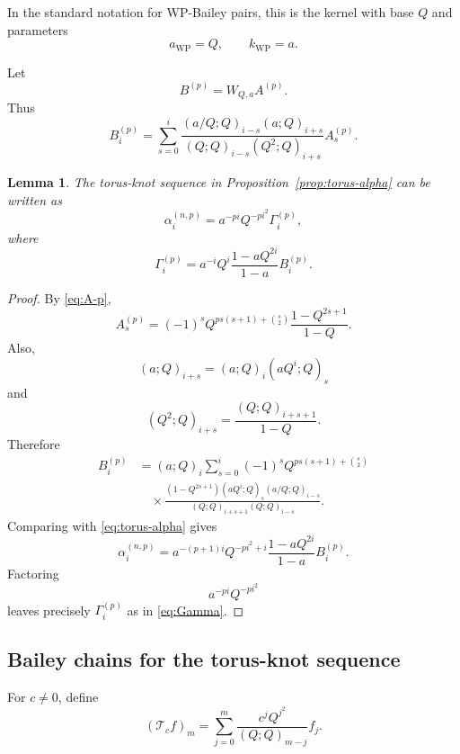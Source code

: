 \documentclass[11pt]{amsart}
\newtheorem{lemma}[theorem]{Lemma}
\begin{document}
In the standard notation for WP-Bailey pairs, this is the kernel with
base \(Q\) and parameters
\[
a_{\mathrm{WP}}=Q,
\qquad
k_{\mathrm{WP}}=a.
\]

Let
\begin{equation}\label{eq:B-def}
B^{(p)}
=
W_{Q,a}A^{(p)}.
\end{equation}
Thus
\begin{equation}\label{eq:B-expanded}
B_i^{(p)}
=
\sum_{s=0}^{i}
\frac{
(a/Q;Q)_{i-s}(a;Q)_{i+s}
}{
(Q;Q)_{i-s}(Q^2;Q)_{i+s}
}
A_s^{(p)}.
\end{equation}

\begin{lemma}\label{lem:alpha-B}
The torus-knot sequence in
Proposition~\ref{prop:torus-alpha} can be written as
\begin{equation}\label{eq:alpha-B}
\alpha_i^{(n,p)}
=
a^{-pi}Q^{-pi^2}\Gamma_i^{(p)},
\end{equation}
where
\begin{equation}\label{eq:Gamma}
\Gamma_i^{(p)}
=
a^{-i}Q^i
\frac{1-aQ^{2i}}{1-a}
B_i^{(p)}.
\end{equation}
\end{lemma}

\begin{proof}
By \eqref{eq:A-p},
\[
A_s^{(p)}
=
(-1)^s
Q^{ps(s+1)+\binom{s}{2}}
\frac{1-Q^{2s+1}}{1-Q}.
\]
Also,
\[
(a;Q)_{i+s}
=
(a;Q)_i(aQ^i;Q)_s
\]
and
\[
(Q^2;Q)_{i+s}
=
\frac{(Q;Q)_{i+s+1}}{1-Q}.
\]
Therefore
\begin{align*}
B_i^{(p)}
&=
(a;Q)_i
\sum_{s=0}^{i}
(-1)^s
Q^{ps(s+1)+\binom{s}{2}}
\\
&\quad\times
\frac{
(1-Q^{2s+1})
(aQ^i;Q)_s
(a/Q;Q)_{i-s}
}{
(Q;Q)_{i+s+1}
(Q;Q)_{i-s}
}.
\end{align*}
Comparing with \eqref{eq:torus-alpha} gives
\[
\alpha_i^{(n,p)}
=
a^{-(p+1)i}Q^{-pi^2+i}
\frac{1-aQ^{2i}}{1-a}
B_i^{(p)}.
\]
Factoring
\[
a^{-pi}Q^{-pi^2}
\]
leaves precisely \(\Gamma_i^{(p)}\) as in
\eqref{eq:Gamma}.
\end{proof}

\subsection{Bailey chains for the torus-knot sequence}
\label{sec:bailey-chain}

For \(c\neq0\), define
\begin{equation}\label{eq:T-def}
(\mathcal T_cf)_m
=
\sum_{j=0}^{m}
\frac{
c^jQ^{j^2}
}{
(Q;Q)_{m-j}
}
f_j.
\end{equation}
\end{document}
